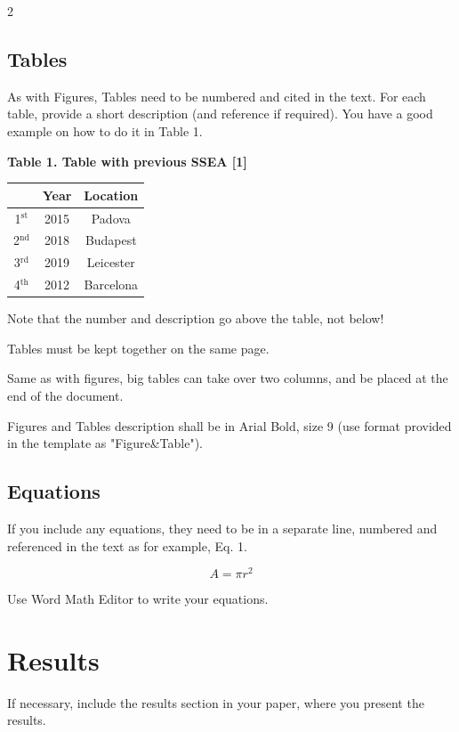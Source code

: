 \documentclass[10pt]{article}
\begin{document}
\begin{multicols}{2}
\subsection{Tables}
As with Figures, Tables need to be numbered and cited in the text. For each table, provide a short description (and reference if required). You have a good example on how to do it in Table 1.

\begin{center}
    \textbf{Table 1. Table with previous SSEA [1]}
    \vspace{0.5em}
    
    \begin{tabular}{|c|c|c|}
        \hline
        & Year & Location \\
        \hline
        1$^{\text{st}}$ & 2015 & Padova \\
        2$^{\text{nd}}$ & 2018 & Budapest \\
        3$^{\text{rd}}$ & 2019 & Leicester \\
        4$^{\text{th}}$ & 2012 & Barcelona \\
        \hline
    \end{tabular}
\end{center}

\newpage

Note that the number and description go above the table, not below!

Tables must be kept together on the same page.

Same as with figures, big tables can take over two columns, and be placed at the end of the document.

Figures and Tables description shall be in Arial Bold, size 9 (use format provided in the template as "Figure\&Table").

\subsection{Equations}
If you include any equations, they need to be in a separate line, numbered and referenced in the text as for example, Eq. 1.

\begin{equation}
A = \pi r^2 \tag{1}
\end{equation}

Use Word Math Editor to write your equations.

\section{Results}
If necessary, include the results section in your paper, where you present the results.


\end{multicols}
\end{document}

